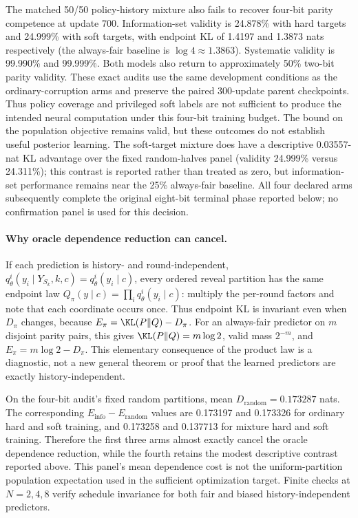 The matched 50/50 policy-history mixture also fails to recover four-bit parity competence at update 700. Information-set validity is 24.878\% with hard targets and 24.999\% with soft targets, with endpoint KL of 1.4197 and 1.3873 nats respectively (the always-fair baseline is $\log4\approx1.3863$). Systematic validity is 99.990\% and 99.999\%. Both models also return to approximately 50\% two-bit parity validity. These exact audits use the same development conditions as the ordinary-corruption arms and preserve the paired 300-update parent checkpoints. Thus policy coverage and privileged soft labels are not sufficient to produce the intended neural computation under this four-bit training budget. The bound on the population objective remains valid, but these outcomes do not establish useful posterior learning. The soft-target mixture does have a descriptive 0.03557-nat KL advantage over the fixed random-halves panel (validity 24.999\% versus 24.311\%); this contrast is reported rather than treated as zero, but information-set performance remains near the 25\% always-fair baseline. All four declared arms subsequently complete the original eight-bit terminal phase reported below; no confirmation panel is used for this decision.


\paragraph{Why oracle dependence reduction can cancel.}
If each prediction is history- and round-independent, $q_\theta^i(y_i\mid Y_{S_k},k,c)=q_\theta^i(y_i\mid c)$, every ordered reveal partition has the same endpoint law $Q_\pi(y\mid c)=\prod_iq_\theta^i(y_i\mid c)$: multiply the per-round factors and note that each coordinate occurs once. Thus endpoint KL is invariant even when $D_\pi$ changes, because $E_\pi=\KL(P\Vert Q)-D_\pi$. For an always-fair predictor on $m$ disjoint parity pairs, this gives $\KL(P\Vert Q)=m\log2$, valid mass $2^{-m}$, and $E_\pi=m\log2-D_\pi$. This elementary consequence of the product law is a diagnostic, not a new general theorem or proof that the learned predictors are exactly history-independent.

On the four-bit audit's fixed random partitions, mean $D_{\mathrm{random}}=0.173287$ nats. The corresponding $E_{\mathrm{info}}-E_{\mathrm{random}}$ values are 0.173197 and 0.173326 for ordinary hard and soft training, and 0.173258 and 0.137713 for mixture hard and soft training. Therefore the first three arms almost exactly cancel the oracle dependence reduction, while the fourth retains the modest descriptive contrast reported above. This panel's mean dependence cost is not the uniform-partition population expectation used in the sufficient optimization target. Finite checks at $N=2,4,8$ verify schedule invariance for both fair and biased history-independent predictors.

